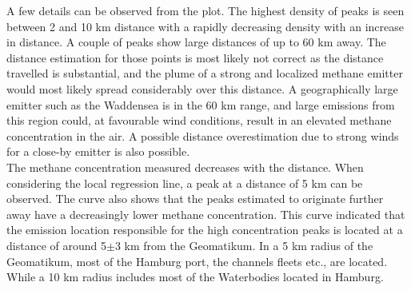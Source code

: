 A few details can be observed from the plot. The highest density of peaks is seen between 2 and 10 km distance with a rapidly decreasing density with an increase in distance. A couple of peaks show large distances of up to 60 km away. The distance estimation for those points is most likely not correct as the distance travelled is substantial, and the plume of a  strong and  localized methane emitter would most likely spread considerably over this distance. A geographically large emitter such as the Waddensea is in the 60 km range, and large emissions from this region could, at favourable wind conditions, result in an elevated methane concentration in the air. A possible distance overestimation due to strong winds for a close-by emitter is also possible.\\
The methane concentration measured decreases with the distance. When considering the  local regression line, a peak at a distance of 5 km can be observed. The curve also shows that the peaks estimated to originate further away have a decreasingly lower methane concentration. This curve indicated that the emission location responsible for the high concentration peaks is located at a distance of around 5$\pm$3 km from the Geomatikum. In a 5 km radius of the Geomatikum, most of the Hamburg port, the channels fleets etc., are located. While a 10 km radius includes most of the Waterbodies located in Hamburg.

